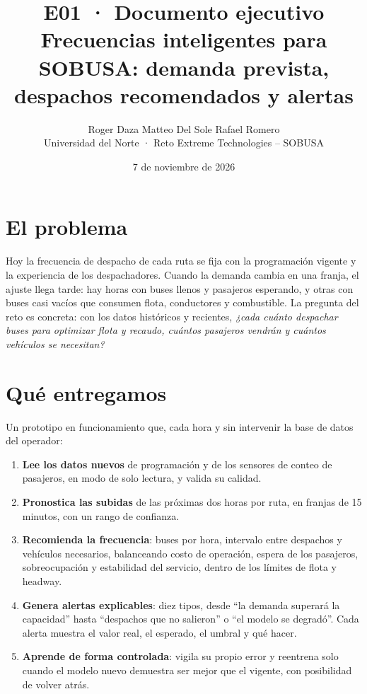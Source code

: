 \documentclass[11pt,a4paper]{article}
\title{\textbf{E01 · Documento ejecutivo}\\[0.3em]
\large Frecuencias inteligentes para SOBUSA: demanda prevista, despachos recomendados y alertas}
\author{Roger Daza \quad Matteo Del Sole \quad Rafael Romero\\[0.2em]\small Universidad del Norte · Reto Extreme Technologies -- SOBUSA}
\date{7 de noviembre de 2026}
\begin{document}
\maketitle

\section*{El problema}

Hoy la frecuencia de despacho de cada ruta se fija con la programación vigente y la experiencia de los despachadores. Cuando la demanda cambia en una franja, el ajuste llega tarde: hay horas con buses llenos y pasajeros esperando, y otras con buses casi vacíos que consumen flota, conductores y combustible. La pregunta del reto es concreta: con los datos históricos y recientes, \emph{¿cada cuánto despachar buses para optimizar flota y recaudo, cuántos pasajeros vendrán y cuántos vehículos se necesitan?}

\section*{Qué entregamos}

Un prototipo en funcionamiento que, cada hora y sin intervenir la base de datos del operador:

\begin{enumerate}
  \setlength{\itemsep}{0.15em}
  \item \textbf{Lee los datos nuevos} de programación y de los sensores de conteo de pasajeros, en modo de solo lectura, y valida su calidad.
  \item \textbf{Pronostica las subidas} de las próximas dos horas por ruta, en franjas de 15 minutos, con un rango de confianza.
  \item \textbf{Recomienda la frecuencia}: buses por hora, intervalo entre despachos y vehículos necesarios, balanceando costo de operación, espera de los pasajeros, sobreocupación y estabilidad del servicio, dentro de los límites de flota y headway.
  \item \textbf{Genera alertas explicables}: diez tipos, desde ``la demanda superará la capacidad'' hasta ``despachos que no salieron'' o ``el modelo se degradó''. Cada alerta muestra el valor real, el esperado, el umbral y qué hacer.
  \item \textbf{Aprende de forma controlada}: vigila su propio error y reentrena solo cuando el modelo nuevo demuestra ser mejor que el vigente, con posibilidad de volver atrás.
\end{enumerate}
\end{document}

